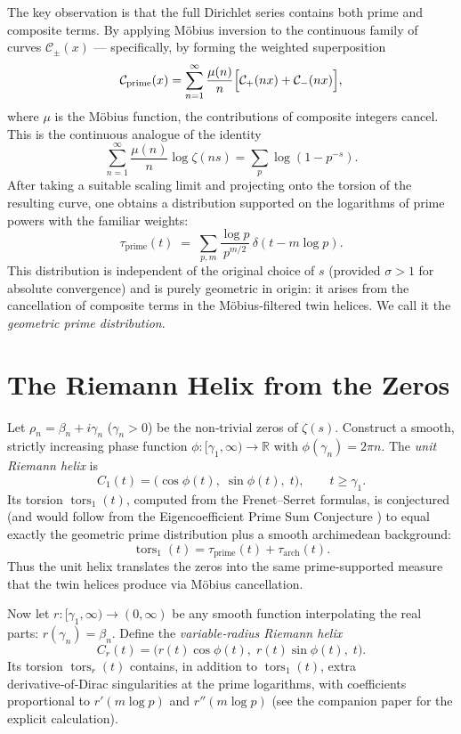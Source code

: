 \documentclass[12pt,a4paper]{article}
\newcommand{\R}{\mathbb{R}}
\newcommand{\tors}{\operatorname{tors}}
\begin{document}
The key observation is that the full Dirichlet series contains both prime and composite terms.  By applying M\"obius inversion to the continuous family of curves $\mathcal{C}_\pm(x)$ — specifically, by forming the weighted superposition
\[
\mathcal{C}_{\text{prime}}(x) = \sum_{n=1}^\infty \frac{\mu(n)}{n} \Bigl[ \mathcal{C}_+(nx) + \mathcal{C}_-(nx) \Bigr],
\]
where $\mu$ is the M\"obius function, the contributions of composite integers cancel.  This is the continuous analogue of the identity
\[
\sum_{n=1}^\infty \frac{\mu(n)}{n}\log\zeta(ns) = \sum_p \log(1-p^{-s}).
\]
After taking a suitable scaling limit and projecting onto the torsion of the resulting curve, one obtains a distribution supported on the logarithms of prime powers with the familiar weights:
\begin{equation}\label{prime_dist}
\tau_{\text{prime}}(t) \;=\; \sum_{p,m} \frac{\log p}{p^{m/2}} \, \delta(t - m\log p).
\end{equation}
This distribution is independent of the original choice of $s$ (provided $\sigma>1$ for absolute convergence) and is purely geometric in origin: it arises from the cancellation of composite terms in the M\"obius‑filtered twin helices.  We call it the \emph{geometric prime distribution}.

\section{The Riemann Helix from the Zeros}

Let $\rho_n = \beta_n + i\gamma_n$ ($\gamma_n>0$) be the non‑trivial zeros of $\zeta(s)$.  Construct a smooth, strictly increasing phase function $\phi:[\gamma_1,\infty)\to\R$ with $\phi(\gamma_n)=2\pi n$.  The \emph{unit Riemann helix} is
\[
C_1(t) = \bigl( \cos\phi(t),\; \sin\phi(t),\; t \bigr),\qquad t\ge\gamma_1 .
\]
Its torsion $\tors_1(t)$, computed from the Frenet–Serret formulas, is conjectured (and would follow from the Eigencoefficient Prime Sum Conjecture \cite{CCM}) to equal exactly the geometric prime distribution plus a smooth archimedean background:
\begin{equation}\label{tors_unit}
\tors_1(t) = \tau_{\text{prime}}(t) + \tau_{\text{arch}}(t).
\end{equation}
Thus the unit helix translates the zeros into the same prime‑supported measure that the twin helices produce via M\"obius cancellation.

Now let $r:[\gamma_1,\infty)\to(0,\infty)$ be any smooth function interpolating the real parts: $r(\gamma_n)=\beta_n$.  Define the \emph{variable‑radius Riemann helix}
\[
C_r(t) = \bigl( r(t)\cos\phi(t),\; r(t)\sin\phi(t),\; t \bigr).
\]
Its torsion $\tors_r(t)$ contains, in addition to $\tors_1(t)$, extra derivative‑of‑Dirac singularities at the prime logarithms, with coefficients proportional to $r'(m\log p)$ and $r''(m\log p)$ (see the companion paper for the explicit calculation).
\end{document}
